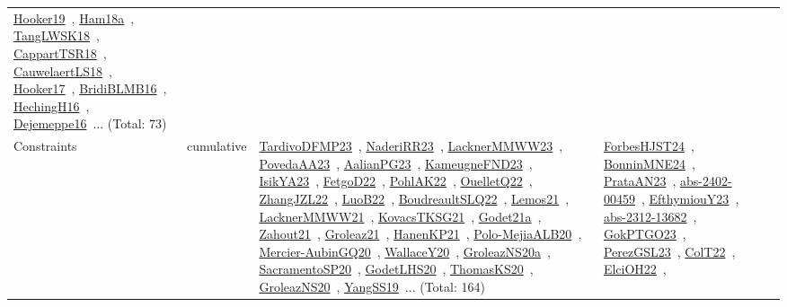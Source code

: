 {\begin{longtable}{lp{3cm}>{\raggedright\arraybackslash}p{6cm}>{\raggedright\arraybackslash}p{6cm}>{\raggedright\arraybackslash}p{8cm}}
\href{../works/Hooker19.pdf}{Hooker19}~\cite{Hooker19}, \href{../works/Ham18a.pdf}{Ham18a}~\cite{Ham18a}, \href{../works/TangLWSK18.pdf}{TangLWSK18}~\cite{TangLWSK18}, \href{../works/CappartTSR18.pdf}{CappartTSR18}~\cite{CappartTSR18}, \href{../works/CauwelaertLS18.pdf}{CauwelaertLS18}~\cite{CauwelaertLS18}, \href{../works/Hooker17.pdf}{Hooker17}~\cite{Hooker17}, \href{../works/BridiBLMB16.pdf}{BridiBLMB16}~\cite{BridiBLMB16}, \href{../works/HechingH16.pdf}{HechingH16}~\cite{HechingH16}, \href{../works/Dejemeppe16.pdf}{Dejemeppe16}~\cite{Dejemeppe16}... (Total: 73)\\
Constraints & cumulative & \href{../works/TardivoDFMP23.pdf}{TardivoDFMP23}~\cite{TardivoDFMP23}, \href{../works/NaderiRR23.pdf}{NaderiRR23}~\cite{NaderiRR23}, \href{../works/LacknerMMWW23.pdf}{LacknerMMWW23}~\cite{LacknerMMWW23}, \href{../works/PovedaAA23.pdf}{PovedaAA23}~\cite{PovedaAA23}, \href{../works/AalianPG23.pdf}{AalianPG23}~\cite{AalianPG23}, \href{../works/KameugneFND23.pdf}{KameugneFND23}~\cite{KameugneFND23}, \href{../works/IsikYA23.pdf}{IsikYA23}~\cite{IsikYA23}, \href{../works/FetgoD22.pdf}{FetgoD22}~\cite{FetgoD22}, \href{../works/PohlAK22.pdf}{PohlAK22}~\cite{PohlAK22}, \href{../works/OuelletQ22.pdf}{OuelletQ22}~\cite{OuelletQ22}, \href{../works/ZhangJZL22.pdf}{ZhangJZL22}~\cite{ZhangJZL22}, \href{../works/LuoB22.pdf}{LuoB22}~\cite{LuoB22}, \href{../works/BoudreaultSLQ22.pdf}{BoudreaultSLQ22}~\cite{BoudreaultSLQ22}, \href{../works/Lemos21.pdf}{Lemos21}~\cite{Lemos21}, \href{../works/LacknerMMWW21.pdf}{LacknerMMWW21}~\cite{LacknerMMWW21}, \href{../works/KovacsTKSG21.pdf}{KovacsTKSG21}~\cite{KovacsTKSG21}, \href{../works/Godet21a.pdf}{Godet21a}~\cite{Godet21a}, \href{../works/Zahout21.pdf}{Zahout21}~\cite{Zahout21}, \href{../works/Groleaz21.pdf}{Groleaz21}~\cite{Groleaz21}, \href{../works/HanenKP21.pdf}{HanenKP21}~\cite{HanenKP21}, \href{../works/Polo-MejiaALB20.pdf}{Polo-MejiaALB20}~\cite{Polo-MejiaALB20}, \href{../works/Mercier-AubinGQ20.pdf}{Mercier-AubinGQ20}~\cite{Mercier-AubinGQ20}, \href{../works/WallaceY20.pdf}{WallaceY20}~\cite{WallaceY20}, \href{../works/GroleazNS20a.pdf}{GroleazNS20a}~\cite{GroleazNS20a}, \href{../works/SacramentoSP20.pdf}{SacramentoSP20}~\cite{SacramentoSP20}, \href{../works/GodetLHS20.pdf}{GodetLHS20}~\cite{GodetLHS20}, \href{../works/ThomasKS20.pdf}{ThomasKS20}~\cite{ThomasKS20}, \href{../works/GroleazNS20.pdf}{GroleazNS20}~\cite{GroleazNS20}, \href{../works/YangSS19.pdf}{YangSS19}~\cite{YangSS19}... (Total: 164) & \href{../works/ForbesHJST24.pdf}{ForbesHJST24}~\cite{ForbesHJST24}, \href{../works/BonninMNE24.pdf}{BonninMNE24}~\cite{BonninMNE24}, \href{../works/PrataAN23.pdf}{PrataAN23}~\cite{PrataAN23}, \href{../works/abs-2402-00459.pdf}{abs-2402-00459}~\cite{abs-2402-00459}, \href{../works/EfthymiouY23.pdf}{EfthymiouY23}~\cite{EfthymiouY23}, \href{../works/abs-2312-13682.pdf}{abs-2312-13682}~\cite{abs-2312-13682}, \href{../works/GokPTGO23.pdf}{GokPTGO23}~\cite{GokPTGO23}, \href{../works/PerezGSL23.pdf}{PerezGSL23}~\cite{PerezGSL23}, \href{../works/ColT22.pdf}{ColT22}~\cite{ColT22}, \href{../works/ElciOH22.pdf}{ElciOH22}~\cite{ElciOH22}, 
\end{longtable}}

